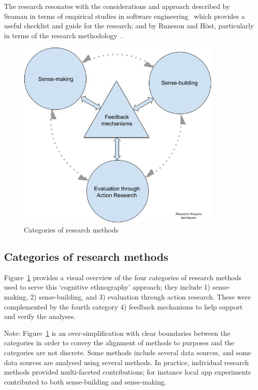 The research resonates with the considerations and approach described by Seaman in terms of empirical studies in software engineering~\citep{seaman1999_qualitative_methods_in_esse} which provides a useful checklist and guide for the research; and by Runeson and Höst, particularly in terms of the research methodology~\citep[p.134]{runeson_2008_guidelines_for_conducting_and_reporting_case_study_research_in_sw_eng}. 


\begin{figure}
    \centering
    \includegraphics[width=10cm]{images/my/analysis-techniques-in-PhD-08-Nov-2021.jpeg}
    \caption{Categories of research methods}
    \label{fig:categories-of-research-methods}
\end{figure}

\subsection{Categories of research methods}
Figure~\ref{fig:categories-of-research-methods} provides a visual overview of the four categories of research methods used to serve this `cognitive ethnography' approach; they include 1) sense-making, 2) sense-building, and 3) evaluation through action research. These were complemented by the fourth category 4) feedback mechanisms to help support and verify the analyses. 

Note: Figure~\ref{fig:categories-of-research-methods} is an over-simplification with clear boundaries between the categories in order to convey the alignment of methods to purposes and the categories are not discrete.  Some methods include several data sources, and some data sources are analysed using several methods. In practice, individual research methods provided multi-faceted contributions; for instance local app experiments contributed to both sense-building and sense-making. 

